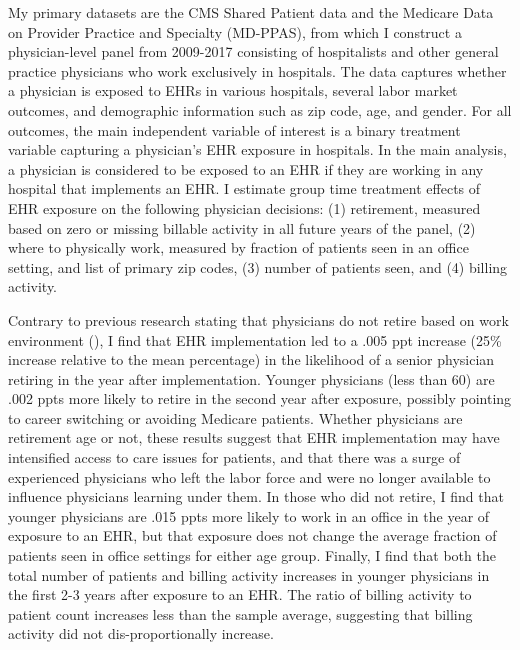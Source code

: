 \documentclass[11pt]{article}
\begin{document}
My primary datasets are the CMS Shared Patient data and the Medicare Data on Provider Practice and Specialty (MD-PPAS), from which I construct a physician-level panel from 2009-2017 consisting of hospitalists and other general practice physicians who work exclusively in hospitals. The data captures whether a physician is exposed to EHRs in various hospitals, several labor market outcomes, and demographic information such as zip code, age, and gender. For all outcomes, the main independent variable of interest is a binary treatment variable capturing a physician's EHR exposure in hospitals. In the main analysis, a physician is considered to be exposed to an EHR if they are working in any hospital that implements an EHR. I estimate group time treatment effects of EHR exposure on the following physician decisions: (1) retirement, measured based on zero or missing billable activity in all future years of the panel, (2) where to physically work, measured by fraction of patients seen in an office setting, and list of primary zip codes, (3) number of patients seen, and (4) billing activity. 

Contrary to previous research stating that physicians do not retire based on work environment (\cite{Bahrami2002}), I find that EHR implementation led to a .005 ppt increase (25\% increase relative to the mean percentage) in the likelihood of a senior physician retiring in the year after implementation. Younger physicians (less than 60) are .002 ppts more likely to retire in the second year after exposure, possibly pointing to career switching or avoiding Medicare patients. Whether physicians are retirement age or not, these results suggest that EHR implementation may have intensified access to care issues for patients, and that there was a surge of experienced physicians who left the labor force and were no longer available to influence physicians learning under them. In those who did not retire, I find that younger physicians are .015 ppts more likely to work in an office in the year of exposure to an EHR, but that exposure does not change the average fraction of patients seen in office settings for either age group. Finally, I find that both the total number of patients and billing activity increases in younger physicians in the first 2-3 years after exposure to an EHR. The ratio of billing activity to patient count increases less than the sample average, suggesting that billing activity did not dis-proportionally increase. 
\end{document}
